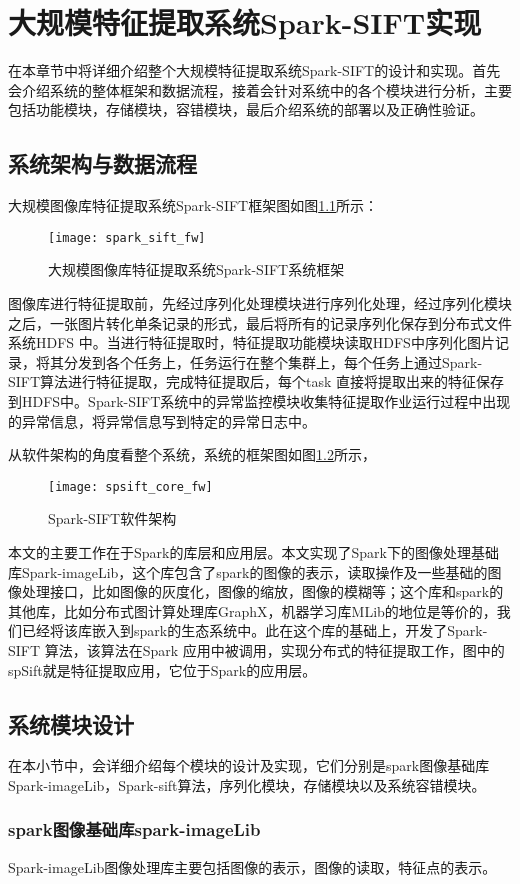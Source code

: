 ﻿\chapter{大规模特征提取系统Spark-SIFT实现}
在本章节中将详细介绍整个大规模特征提取系统Spark-SIFT的设计和实现。首先会介绍系统的整体框架和数据流程，接着会针对系统中的各个模块进行分析，主要包括功能模块，存储模块，容错模块，最后介绍系统的部署以及正确性验证。

\section{系统架构与数据流程}
大规模图像库特征提取系统Spark-SIFT框架图如图\ref{fig:spark_sift_fw}所示：
\begin{figure}[htp]
\centering
\texttt{[image: spark\_sift\_fw]}
\caption{大规模图像库特征提取系统Spark-SIFT系统框架}
\label{fig:spark_sift_fw}
\end{figure}
图像库进行特征提取前，先经过序列化处理模块进行序列化处理，经过序列化模块之后，一张图片转化单条记录的形式，最后将所有的记录序列化保存到分布式文件系统HDFS 中。当进行特征提取时，特征提取功能模块读取HDFS中序列化图片记录，将其分发到各个任务上，任务运行在整个集群上，每个任务上通过Spark-SIFT算法进行特征提取，完成特征提取后，每个task 直接将提取出来的特征保存到HDFS中。Spark-SIFT系统中的异常监控模块收集特征提取作业运行过程中出现的异常信息，将异常信息写到特定的异常日志中。

从软件架构的角度看整个系统，系统的框架图如图\ref{fig:spsift_core_fw}所示，
\begin{figure}[htp]
\centering
\texttt{[image: spsift\_core\_fw]}
\caption{Spark-SIFT软件架构}
\label{fig:spsift_core_fw}
\end{figure}
本文的主要工作在于Spark的库层和应用层。本文实现了Spark下的图像处理基础库Spark-imageLib，这个库包含了spark的图像的表示，读取操作及一些基础的图像处理接口，比如图像的灰度化，图像的缩放，图像的模糊等；这个库和spark的其他库，比如分布式图计算处理库GraphX，机器学习库MLib的地位是等价的，我们已经将该库嵌入到spark的生态系统中。此在这个库的基础上，开发了Spark-SIFT 算法，该算法在Spark 应用中被调用，实现分布式的特征提取工作，图中的spSift就是特征提取应用，它位于Spark的应用层。
\section{系统模块设计}
在本小节中，会详细介绍每个模块的设计及实现，它们分别是spark图像基础库Spark-imageLib，Spark-sift算法，序列化模块，存储模块以及系统容错模块。
\subsection{spark图像基础库spark-imageLib}
Spark-imageLib图像处理库主要包括图像的表示，图像的读取，特征点的表示。
